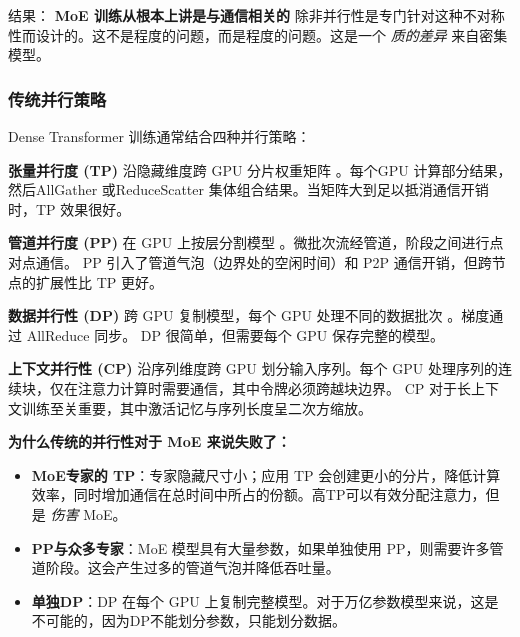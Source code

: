 \documentclass[10pt,logo,copyright]{nvidiatechreport_zh}
\begin{document}
结果： \textbf{MoE 训练从根本上讲是与通信相关的} 除非并行性是专门针对这种不对称性而设计的。这不是程度的问题，而是程度的问题。这是一个 \emph{质的差异} 来自密集模型。

\subsubsection{传统并行策略}\label{sec:traditional-parallelism}

Dense Transformer 训练通常结合四种并行策略：

\textbf{张量并行度 (TP)} 沿隐藏维度跨 GPU 分片权重矩阵 \cite{shoeybi2020megatronlmtrainingmultibillionparameter}。每个GPU 计算部分结果，然后AllGather 或ReduceScatter 集体组合结果。当矩阵大到足以抵消通信开销时，TP 效果很好。

\textbf{管道并行度 (PP)} 在 GPU 上按层分割模型 \cite{huang2019gpipe,narayanan2019pipedream,shoeybi2020megatronlmtrainingmultibillionparameter,qi2023zerobubblepipelineparallelism,qi2024pipelineparallelismcontrollablememory,zhang2022chimera,guan2025pipeoptimensuringeffective1f1b}。微批次流经管道，阶段之间进行点对点通信。 PP 引入了管道气泡（边界处的空闲时间）和 P2P 通信开销，但跨节点的扩展性比 TP 更好。

\textbf{数据并行性 (DP)} 跨 GPU 复制模型，每个 GPU 处理不同的数据批次 \cite{shallue2019measuringeffectsdataparallelism,bai2022moderndistributeddataparallellargescale}。梯度通过 AllReduce 同步。 DP 很简单，但需要每个 GPU 保存完整的模型。

\textbf{上下文并行性 (CP)} \cite{korthikanti2023sequence,liu2023ringattention,jacobs2023deepspeedulysses} 沿序列维度跨 GPU 划分输入序列。每个 GPU 处理序列的连续块，仅在注意力计算时需要通信，其中令牌必须跨越块边界。 CP 对于长上下文训练至关重要，其中激活记忆与序列长度呈二次方缩放。

\textbf{为什么传统的并行性对于 MoE 来说失败了：}

\begin{itemize}
    \item \textbf{MoE专家的 TP}：专家隐藏尺寸小；应用 TP 会创建更小的分片，降低计算效率，同时增加通信在总时间中所占的份额。高TP可以有效分配注意力，但是 \emph{伤害} MoE。
    \item \textbf{PP与众多专家}：MoE 模型具有大量参数，如果单独使用 PP，则需要许多管道阶段。这会产生过多的管道气泡并降低吞吐量。
    \item \textbf{单独DP}：DP 在每个 GPU 上复制完整模型。对于万亿参数模型来说，这是不可能的，因为DP不能划分参数，只能划分数据。
\end{itemize}
\end{document}
